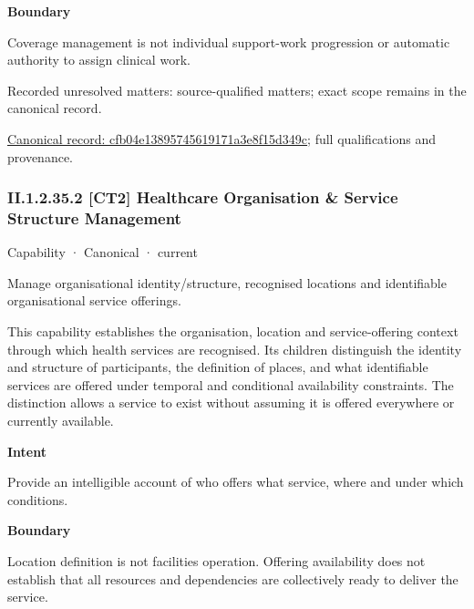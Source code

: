 \textbf{Boundary}



Coverage management is not individual support-work progression or automatic authority to assign clinical work.


{\small Recorded unresolved matters: source-qualified matters; exact scope remains in the canonical record.}\par
{\footnotesize \href{../../../../continuum/strategy/capability/cfb04e13895745619171a3e8f15d349c.md}{Canonical record: cfb04e13895745619171a3e8f15d349c}; full qualifications and provenance.}\par
\subsubsection*{II.1.2.35.2 [CT2] Healthcare Organisation \& Service Structure Management}
\label{navigation:II.1.2.35.2}

\label{element:de8c1b408c774e59899662495f4d6ced}
{\small Capability · Canonical · current}\par

Manage organisational identity/structure, recognised locations and identifiable organisational service offerings.



This capability establishes the organisation, location and service-offering context through which health services are recognised. Its children distinguish the identity and structure of participants, the definition of places, and what identifiable services are offered under temporal and conditional availability constraints. The distinction allows a service to exist without assuming it is offered everywhere or currently available.



\textbf{Intent}



Provide an intelligible account of who offers what service, where and under which conditions.



\textbf{Boundary}



Location definition is not facilities operation. Offering availability does not establish that all resources and dependencies are collectively ready to deliver the service.


